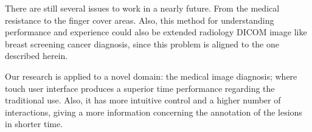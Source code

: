 \documentclass{sigchi}
\begin{document}
There are still several issues to work in a nearly future. From the medical resistance to the finger cover areas. Also, this method for understanding performance and experience could also be extended radiology DICOM image like breast screening cancer diagnosis, since this problem is aligned to the one described herein.

Our research is applied to a novel domain: the medical image diagnosis; where touch user interface produces a superior time performance regarding  the traditional use. Also, it has more intuitive control and a higher number of interactions, giving a more information concerning the annotation of the lesions in shorter time.

%
%
%
%
%
\balance



\end{document}
